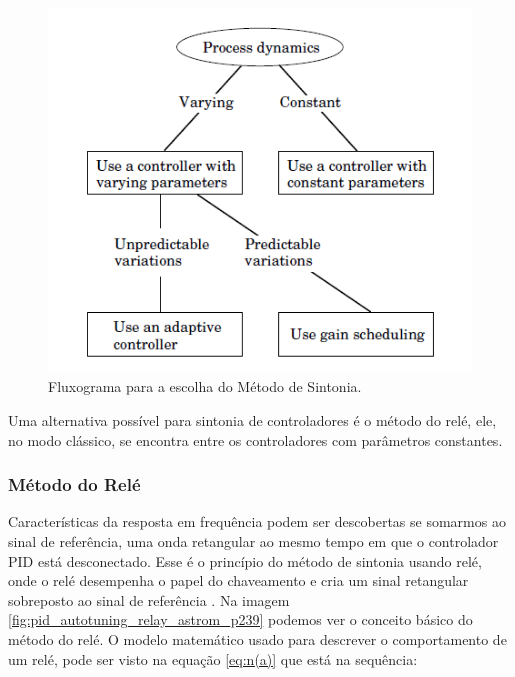\begin{figure}[!ht]
  \caption{Fluxograma para a escolha do Método de Sintonia.}
  \begin{center}
      \includegraphics[scale=0.75]{img/escolha_controle_astrom_p236}
  \end{center}
  \label{fig:escolha_controle_astrom_p236}
\end{figure}

Uma alternativa possível para sintonia de controladores é o método do relé, ele, no modo clássico, se encontra entre os controladores com parâmetros constantes.

\subsubsection{Método do Relé}

Características da resposta em frequência podem ser descobertas se somarmos ao sinal de referência, uma onda retangular ao mesmo tempo em que o controlador PID está desconectado. Esse é o princípio do método de sintonia usando relé, onde o relé desempenha o papel do chaveamento e cria um sinal retangular sobreposto ao sinal de referência \cite{Levine1996}. Na imagem \ref{fig:pid_autotuning_relay_astrom_p239} podemos ver o conceito básico do método do relé. O modelo matemático usado para descrever o comportamento de um relé, pode ser visto na equação \ref{eq:n(a)} que está na sequência:
 
